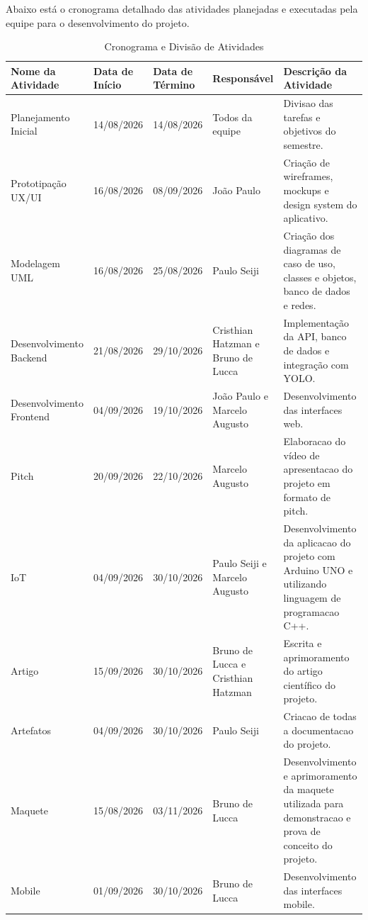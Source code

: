 \documentclass[11pt,a4paper]{article}
\begin{document}
Abaixo está o cronograma detalhado das atividades planejadas e executadas pela equipe para o desenvolvimento do projeto.

\begin{table}[H]
\centering
\caption{Cronograma e Divisão de Atividades}
\label{tab:cronograma}
\small
\renewcommand{\arraystretch}{1.3}
\begin{tabular}{|p{2.5cm}|p{1.8cm}|p{1.8cm}|p{2.5cm}|>{\raggedright\arraybackslash}p{5cm}|}
\hline
\textbf{Nome da Atividade} & \textbf{Data de Início} & \textbf{Data de Término} & \textbf{Responsável} & \textbf{Descrição da Atividade} \\
\hline
Planejamento Inicial & 14/08/2026 & 14/08/2026 & Todos da equipe & Divisao das tarefas e objetivos do semestre. \\
\hline
Prototipação UX/UI & 16/08/2026 & 08/09/2026 & João Paulo & Criação de wireframes, mockups e design system do aplicativo. \\
\hline
Modelagem UML & 16/08/2026 & 25/08/2026 & Paulo Seiji & Criação dos diagramas de caso de uso, classes e objetos, banco de dados e redes. \\
\hline
Desenvolvimento Backend & 21/08/2026 & 29/10/2026 & Cristhian Hatzman e Bruno de Lucca & Implementação da API, banco de dados e integração com YOLO. \\
\hline
Desenvolvimento Frontend & 04/09/2026 & 19/10/2026 & João Paulo e Marcelo Augusto & Desenvolvimento das interfaces web. \\
\hline
Pitch & 20/09/2026 & 22/10/2026 & Marcelo Augusto & Elaboracao do vídeo de apresentacao do projeto em formato de pitch. \\
\hline
IoT & 04/09/2026 & 30/10/2026 & Paulo Seiji e Marcelo Augusto & Desenvolvimento da aplicacao do projeto com Arduino UNO e utilizando linguagem de programacao C++. \\
\hline
Artigo & 15/09/2026 & 30/10/2026 & Bruno de Lucca e Cristhian Hatzman & Escrita e aprimoramento do artigo científico do projeto. \\
\hline
Artefatos & 04/09/2026 & 30/10/2026 & Paulo Seiji & Criacao de todas a documentacao do projeto. \\
\hline
Maquete & 15/08/2026 & 03/11/2026 & Bruno de Lucca & Desenvolvimento e aprimoramento da maquete utilizada para demonstracao e prova de conceito do projeto. \\
\hline
Mobile & 01/09/2026 & 30/10/2026 & Bruno de Lucca & Desenvolvimento das interfaces mobile. \\
\hline
\end{tabular}
\end{table}
\end{document}
